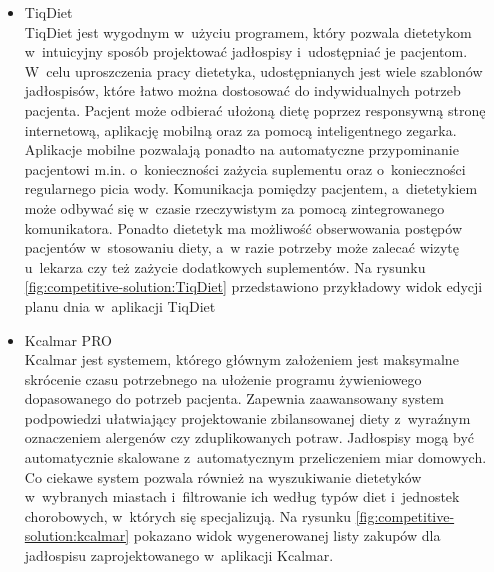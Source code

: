 \begin{itemize}
    \item TiqDiet\\
        TiqDiet\cite{url:TiqDiet} jest wygodnym w~użyciu programem, który pozwala dietetykom w~intuicyjny sposób projektować jadłospisy i~udostępniać je pacjentom.
        W~celu uproszczenia pracy dietetyka, udostępnianych jest wiele szablonów jadłospisów, które łatwo można dostosować do indywidualnych potrzeb pacjenta.
        Pacjent może odbierać ułożoną dietę poprzez responsywną stronę internetową, aplikację mobilną oraz za pomocą inteligentnego zegarka.
        Aplikacje mobilne pozwalają ponadto na automatyczne przypominanie pacjentowi m.in. o~konieczności zażycia suplementu oraz o~konieczności regularnego picia wody.
        Komunikacja pomiędzy pacjentem, a~dietetykiem może odbywać się w~czasie rzeczywistym za pomocą zintegrowanego komunikatora.
        Ponadto dietetyk ma możliwość obserwowania postępów pacjentów w~stosowaniu diety, a~w razie potrzeby może zalecać wizytę u~lekarza czy też zażycie dodatkowych suplementów.
        Na rysunku \ref{fig:competitive-solution:TiqDiet} przedstawiono przykładowy widok edycji planu dnia w~aplikacji TiqDiet


    \item Kcalmar PRO\\
        Kcalmar\cite{url:kcalmar} jest systemem, którego głównym założeniem jest maksymalne skrócenie czasu potrzebnego na ułożenie programu żywieniowego dopasowanego do potrzeb pacjenta.
        Zapewnia zaawansowany system podpowiedzi ułatwiający projektowanie zbilansowanej diety z~wyraźnym oznaczeniem alergenów czy zduplikowanych potraw.
        Jadłospisy mogą być automatycznie skalowane z~automatycznym przeliczeniem miar domowych.
        Co ciekawe system pozwala również na wyszukiwanie dietetyków w~wybranych miastach i~filtrowanie ich według typów diet i~jednostek chorobowych, w~których się specjalizują.
        Na rysunku \ref{fig:competitive-solution:kcalmar} pokazano widok wygenerowanej listy zakupów dla jadłospisu zaprojektowanego w~aplikacji Kcalmar.



\end{itemize}
